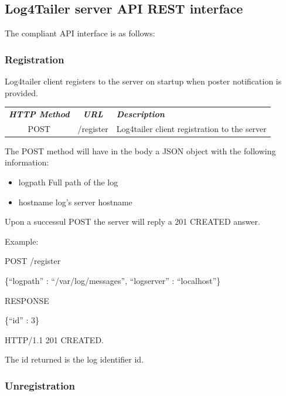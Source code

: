 \subsection{Log4Tailer server API REST interface}

The compliant API interface is as follows:

\subsubsection{Registration}

Log4tailer client registers to the server on startup when poster notification is provided.

\begin{flushleft}
 \begin{tabular}{|c|c|l|}
 \hline 
 \rowcolor{cyan} {\color{white} \textit{\textbf{HTTP Method}}} &  {\color{white} 
  \textit{\textbf{URL}}}  & {\color{white} 
 \textit{\textbf{Description}}}\\
 POST & /register & Log4tailer client registration to the server\\
 \hline
\end{tabular}
\end{flushleft}
The POST method will have in the body a JSON object with the following information:

\begin{itemize}
 \item logpath Full path of the log 
 \item hostname log's server hostname
\end{itemize}

\noindent
Upon a successul POST the server will reply a 201 CREATED answer.

\noindent
Example:

\begin{codeexample}

POST /register

 \{``logpath'' : ``/var/log/messages'', ``logserver'' : ``localhost''\} 

RESPONSE

 \{``id'' : 3\} 

HTTP/1.1 201 CREATED.
\end{codeexample}

The id returned is the log identifier id.

\subsubsection{Unregistration}

